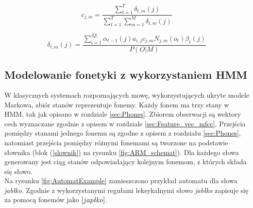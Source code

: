 \documentclass[shortabstract, mgr]{iithesis}
\newcommand{\refBlock}[1]{(\hyperref[#1]{\ref*{#1})}
}
\begin{document}
	   \begin{equation}
	   c_{j,m}=\frac{\sum_{t=1}^T\delta_{t,m}(j)}{\sum_{t=1}^T\sum_{m=1}^M\delta_{t,m}(j)}
	   \label{eqn:b_c_c}
	   \end{equation}
	   
	   \begin{equation}
	   \delta_{t,m}(j)= \frac{\sum_{i=1}^{|Q|}\alpha_{t-1}(j)a_{i,j}c_{j,m}N_{j,m}(o_{t})\beta_{t}(j)}{P(O|M)}
	   \label{eqn:delta}
	   \end{equation}
	   
    \subsection{Modelowanie fonetyki z wykorzystaniem HMM }
    \label{sec:hmm_in_asr}
    W klasycznych systemach rozpoznających mowę, wykorzystujących ukryte modele Markowa, zbiór stanów reprezentuje fonemy. Każdy fonem ma trzy stany w HMM, tak jak opisano w rozdziale \ref{sec:Phones}. Zbiorem obserwacji są wektory cech wyznaczane zgodnie z opisem w rozdziale \ref{sec:Feature_vec_mfcc}. Przejścia pomiędzy stanami jednego fonemu są zgodne z opisem z rozdziału \ref{sec:Phones}, natomiast przejścia pomiędzy różnymi fonemami są tworzone na podstawie słownika (blok \refBlock{slownik} na rysunku \ref{fig:ARM_schemat}). Dla każdego słowa generowany jest ciąg stanów odpowiadający kolejnym fonemom, z których składa się słowo. \\
    Na rysunku \ref{fig:AutomatExample} zamieszczono przykład automatu dla słowa \textit{jabłko}. Zgodnie z wykorzystanymi regułami leksykalnymi słowo \textit{jabłko} zapisuje się za pomocą fonemów jako $[j a p \text{\textit{ł}} k o]$. \\
    
\end{document}
